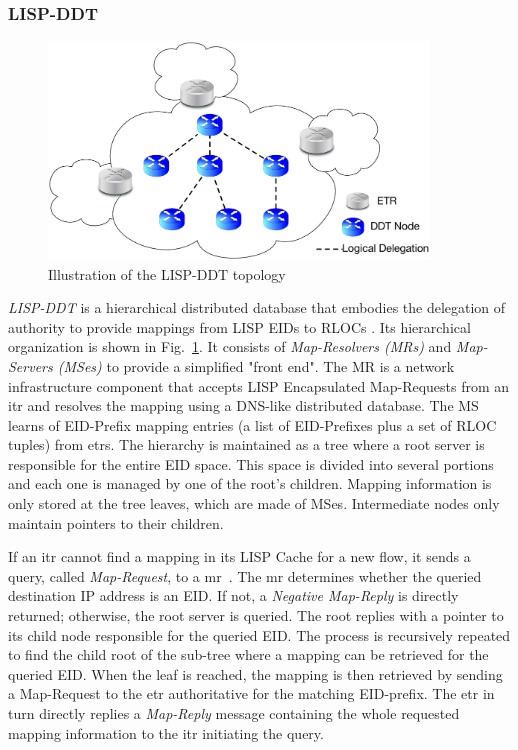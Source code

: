 \subsubsection{LISP-DDT}
\label{sec:lispddt}
\begin{figure}[!t]
	\centering
	\includegraphics[width=0.9\textwidth]{Chapter2/Pics/LISP_DDT.eps}
	\caption{Illustration of the LISP-DDT topology}
	\label{LISP_DDT}
\end{figure}
\emph{LISP-DDT} is a hierarchical distributed database that embodies the delegation of authority to provide mappings from LISP EIDs to RLOCs . Its hierarchical organization is shown in Fig.~\ref{LISP_DDT}. It consists of \emph{Map-Resolvers (MRs)} and \emph{Map-Servers (MSes)} to provide a simplified "front end". The MR is a network infrastructure component that accepts LISP Encapsulated Map-Requests from an \acrshort{itr} and resolves the mapping using a DNS-like distributed database. The MS learns of EID-Prefix mapping entries (a list of EID-Prefixes plus a set of RLOC tuples) from \acrshort{etr}s. The hierarchy is maintained as a tree where a root server is responsible for the entire EID space. This space is divided into several portions and each one is managed by one of the root’s children.
Mapping information is only stored at the tree leaves, which are made of MSes. Intermediate nodes only maintain pointers to their children.

If an \acrshort{itr} cannot find a mapping in its LISP Cache for a new flow, it sends a query, called \emph{Map-Request}, to a \acrshort{mr}~\cite{rfc6833}. The \acrshort{mr} determines whether the queried destination IP address is an EID. If not, a \emph{Negative Map-Reply} is directly returned; otherwise, the root server is queried. The root replies with a pointer to its child node responsible for the queried EID. The process is recursively repeated to find the child root of the sub-tree where a mapping can be retrieved for the queried EID. When the leaf is reached, the mapping is then retrieved by sending a Map-Request to the \acrshort{etr} authoritative for the matching EID-prefix. The \acrshort{etr} in turn directly replies a \emph{Map-Reply} message containing the whole requested mapping information to the \acrshort{itr} initiating the query.

